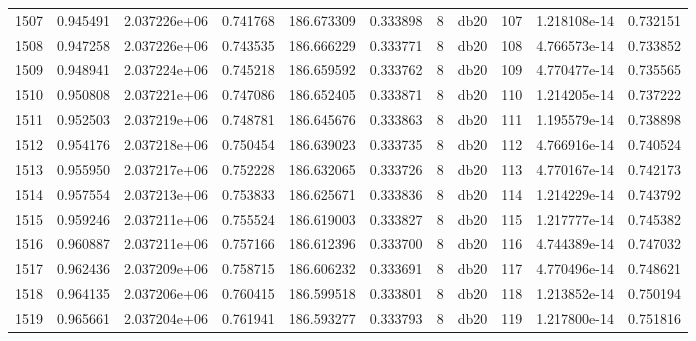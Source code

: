\begin{tabular}{lrrrrrrlrrr}
1507 &    0.945491 &        2.037226e+06 &  0.741768 &              186.673309 &    0.333898 &       8 &         db20 &    107 &   1.218108e-14 &      0.732151 \\
1508 &    0.947258 &        2.037226e+06 &  0.743535 &              186.666229 &    0.333771 &       8 &         db20 &    108 &   4.766573e-14 &      0.733852 \\
1509 &    0.948941 &        2.037224e+06 &  0.745218 &              186.659592 &    0.333762 &       8 &         db20 &    109 &   4.770477e-14 &      0.735565 \\
1510 &    0.950808 &        2.037221e+06 &  0.747086 &              186.652405 &    0.333871 &       8 &         db20 &    110 &   1.214205e-14 &      0.737222 \\
1511 &    0.952503 &        2.037219e+06 &  0.748781 &              186.645676 &    0.333863 &       8 &         db20 &    111 &   1.195579e-14 &      0.738898 \\
1512 &    0.954176 &        2.037218e+06 &  0.750454 &              186.639023 &    0.333735 &       8 &         db20 &    112 &   4.766916e-14 &      0.740524 \\
1513 &    0.955950 &        2.037217e+06 &  0.752228 &              186.632065 &    0.333726 &       8 &         db20 &    113 &   4.770167e-14 &      0.742173 \\
1514 &    0.957554 &        2.037213e+06 &  0.753833 &              186.625671 &    0.333836 &       8 &         db20 &    114 &   1.214229e-14 &      0.743792 \\
1515 &    0.959246 &        2.037211e+06 &  0.755524 &              186.619003 &    0.333827 &       8 &         db20 &    115 &   1.217777e-14 &      0.745382 \\
1516 &    0.960887 &        2.037211e+06 &  0.757166 &              186.612396 &    0.333700 &       8 &         db20 &    116 &   4.744389e-14 &      0.747032 \\
1517 &    0.962436 &        2.037209e+06 &  0.758715 &              186.606232 &    0.333691 &       8 &         db20 &    117 &   4.770496e-14 &      0.748621 \\
1518 &    0.964135 &        2.037206e+06 &  0.760415 &              186.599518 &    0.333801 &       8 &         db20 &    118 &   1.213852e-14 &      0.750194 \\
1519 &    0.965661 &        2.037204e+06 &  0.761941 &              186.593277 &    0.333793 &       8 &         db20 &    119 &   1.217800e-14 &      0.751816 \\

\end{tabular}
